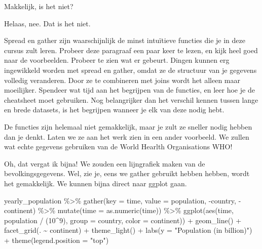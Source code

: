 \documentclass[]{tufte-book}
\newenvironment{Shaded}{}{}
\newcommand{\AttributeTok}[1]{\textcolor[rgb]{0.49,0.56,0.16}{#1}}
\newcommand{\DecValTok}[1]{\textcolor[rgb]{0.25,0.63,0.44}{#1}}
\newcommand{\FunctionTok}[1]{\textcolor[rgb]{0.02,0.16,0.49}{#1}}
\newcommand{\NormalTok}[1]{#1}
\newcommand{\SpecialCharTok}[1]{\textcolor[rgb]{0.25,0.44,0.63}{#1}}
\newcommand{\StringTok}[1]{\textcolor[rgb]{0.25,0.44,0.63}{#1}}
\begin{document}
Makkelijk, is het niet?

Helaas, nee. Dat is het niet.

Spread en gather zijn waarschijnlijk de minst intuïtieve functies die je in deze cursus zult leren. Probeer deze paragraaf een paar keer te lezen, en kijk heel goed naar de voorbeelden. Probeer te zien wat er gebeurt. Dingen kunnen erg ingewikkeld worden met spread en gather, omdat ze de structuur van je gegevens volledig veranderen. Door ze te combineren met joins wordt het alleen maar moeilijker. Spendeer wat tijd aan het begrijpen van de functies, en leer hoe je de cheatsheet moet gebruiken. Nog belangrijker dan het verschil kennen tussen lange en brede datasets, is het begrijpen wanneer je elk van deze nodig hebt.

De functies zijn helemaal niet gemakkelijk, maar je zult ze sneller nodig hebben dan je denkt. Laten we ze aan het werk zien in een ander voorbeeld. We zullen wat echte gegevens gebruiken van de World Hearlth Organisations WHO!

Oh, dat vergat ik bijna! We zouden een lijngrafiek maken van de bevolkingsgegevens. Wel, zie je, eens we gather gebruikt hebben hebben, wordt het gemakkelijk. We kunnen bijna direct naar ggplot gaan.

\begin{Shaded}
\begin{Highlighting}[]
\NormalTok{yearly\_population }\SpecialCharTok{\%\textgreater{}\%}
  \FunctionTok{gather}\NormalTok{(}\AttributeTok{key =}\NormalTok{ time, }\AttributeTok{value =}\NormalTok{ population, }\SpecialCharTok{{-}}\NormalTok{country, }\SpecialCharTok{{-}}\NormalTok{continent) }\SpecialCharTok{\%\textgreater{}\%}
  \FunctionTok{mutate}\NormalTok{(}\AttributeTok{time =} \FunctionTok{as.numeric}\NormalTok{(time)) }\SpecialCharTok{\%\textgreater{}\%}
  \FunctionTok{ggplot}\NormalTok{(}\FunctionTok{aes}\NormalTok{(time, population }\SpecialCharTok{/}\NormalTok{ (}\DecValTok{10}\SpecialCharTok{\^{}}\DecValTok{9}\NormalTok{), }\AttributeTok{group =}\NormalTok{ country, }\AttributeTok{color =}\NormalTok{ continent)) }\SpecialCharTok{+}
  \FunctionTok{geom\_line}\NormalTok{() }\SpecialCharTok{+}
  \FunctionTok{facet\_grid}\NormalTok{(. }\SpecialCharTok{\textasciitilde{}}\NormalTok{ continent) }\SpecialCharTok{+}
  \FunctionTok{theme\_light}\NormalTok{() }\SpecialCharTok{+}
  \FunctionTok{labs}\NormalTok{(}\AttributeTok{y =} \StringTok{"Population (in billion)"}\NormalTok{) }\SpecialCharTok{+}
  \FunctionTok{theme}\NormalTok{(}\AttributeTok{legend.position =} \StringTok{"top"}\NormalTok{)}
\end{Highlighting}
\end{Shaded}
\end{document}
